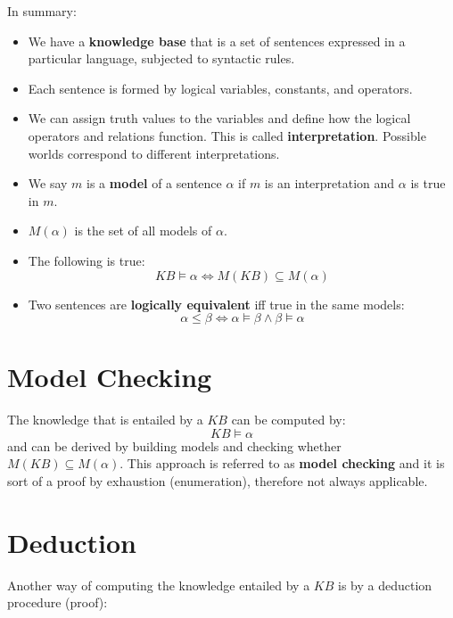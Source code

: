 \documentclass{article}
\begin{document}
In summary:
\begin{itemize}
    \item We have a \textbf{knowledge base} that is a set of sentences expressed in a particular language, subjected to syntactic rules.
    \item Each sentence is formed by logical variables, constants, and operators.
    \item We can assign truth values to the variables and define how the logical operators and relations function. This is called \textbf{interpretation}. Possible worlds correspond to different interpretations.
    \item We say $m$ is a \textbf{model} of a sentence $\alpha$ if $m$ is an interpretation and $\alpha$ is true in $m$.
    \item $M(\alpha)$ is the set of all models of $\alpha$.
    \item The following is true:
    \begin{equation*}
        KB \models \alpha \iff M(KB) \subseteq M(\alpha)
    \end{equation*}
    \item Two sentences are \textbf{logically equivalent} iff true in the same models:
    \begin{equation*}
        \alpha \leq \beta \iff \alpha \models \beta \land \beta \models \alpha
    \end{equation*}
\end{itemize}

\newpage

\section{Model Checking}

The knowledge that is entailed by a $KB$ can be computed by:
\begin{equation*}
    KB \models \alpha
\end{equation*}
and can be derived by building models and checking whether $M(KB) \subseteq M(\alpha)$.
This approach is referred to as \textbf{model checking} and it is sort of a proof by exhaustion (enumeration), therefore not always applicable.

\section{Deduction}

Another way of computing the knowledge entailed by a $KB$ is by a deduction procedure (proof):
\end{document}
